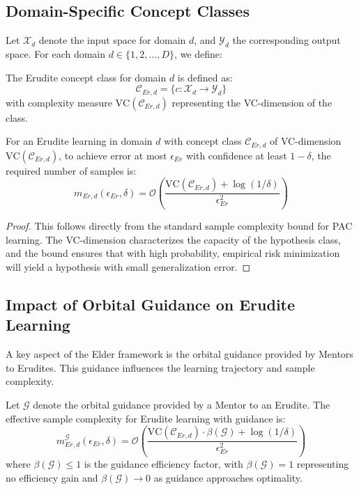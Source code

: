 \subsection{Domain-Specific Concept Classes}

Let $\mathcal{X}_d$ denote the input space for domain $d$, and $\mathcal{Y}_d$ the corresponding output space. For each domain $d \in \{1, 2, \ldots, D\}$, we define:

\begin{definition}
The Erudite concept class for domain $d$ is defined as:
\begin{equation}
\mathcal{C}_{Er,d} = \{c: \mathcal{X}_d \rightarrow \mathcal{Y}_d\}
\end{equation}
with complexity measure $\text{VC}(\mathcal{C}_{Er,d})$ representing the VC-dimension of the class.
\end{definition}

\begin{theorem}
For an Erudite learning in domain $d$ with concept class $\mathcal{C}_{Er,d}$ of VC-dimension $\text{VC}(\mathcal{C}_{Er,d})$, to achieve error at most $\epsilon_{Er}$ with confidence at least $1-\delta$, the required number of samples is:
\begin{equation}
m_{Er,d}(\epsilon_{Er}, \delta) = \mathcal{O}\left(\frac{\text{VC}(\mathcal{C}_{Er,d}) + \log(1/\delta)}{\epsilon_{Er}^2}\right)
\end{equation}
\end{theorem}

\begin{proof}
This follows directly from the standard sample complexity bound for PAC learning. The VC-dimension characterizes the capacity of the hypothesis class, and the bound ensures that with high probability, empirical risk minimization will yield a hypothesis with small generalization error.
\end{proof}

\subsection{Impact of Orbital Guidance on Erudite Learning}

A key aspect of the Elder framework is the orbital guidance provided by Mentors to Erudites. This guidance influences the learning trajectory and sample complexity.

\begin{theorem}
Let $\mathcal{G}$ denote the orbital guidance provided by a Mentor to an Erudite. The effective sample complexity for Erudite learning with guidance is:
\begin{equation}
m_{Er,d}^{\mathcal{G}}(\epsilon_{Er}, \delta) = \mathcal{O}\left(\frac{\text{VC}(\mathcal{C}_{Er,d}) \cdot \beta(\mathcal{G}) + \log(1/\delta)}{\epsilon_{Er}^2}\right)
\end{equation}
where $\beta(\mathcal{G}) \leq 1$ is the guidance efficiency factor, with $\beta(\mathcal{G}) = 1$ representing no efficiency gain and $\beta(\mathcal{G}) \rightarrow 0$ as guidance approaches optimality.
\end{theorem}

